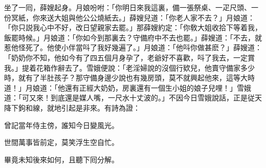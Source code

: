 坐了一囘，薛嫂起身。月娘吩咐：「你明日來我這裏，備一張祭桌、一疋尺頭、一份冥紙，你來送大姐與他公公燒紙去。」薛嫂兒道：「你老人家不去？」月娘道：「你只説我心中不好，改日望親家去罷。」那薛嫂約定：「你敎大姐收拾下等着我，飯罷時候。」月娘道：「你如今到那裏去？守備府中不去也罷。」薛嫂道：「不去，就惹他怪死了。他使小伴當呌了我好幾遍了。」月娘道：「他呌你做甚麽？」薛嫂道：「奶奶你不知，他如今有了四五個月身孕了，老爺好不喜歡，呌了我去，一定賞我。」提着花箱作辭去了。雪娥便說：「老淫婦說的沒個行欵兒，他賣守備家多少時，就有了半肚孩子？那守備身邊少說也有幾房頭，莫不就興起他來，這等大時道！」月娘道：「他還有正經大奶奶，房裏還有一個生小姐的娘子兒哩！」雪娥道：「可又來！到底還是媒人嘴，一尺水十丈波的。」不因今日雪娥說話，正是従天降下鉤和線，就地引起是非來。有詩為證：

\begin{myquote}
曾記當年侍主傍，誰知今日變風光。

世間萬事皆前定，莫笑浮生空自忙。
\end{myquote}

畢竟未知後來如何，且聽下囘分解。

